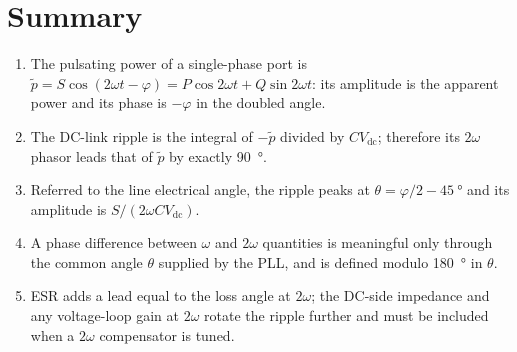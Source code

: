 \section{Summary}

\begin{enumerate}
  \item The pulsating power of a single-phase port is
        $\tilde p = S\cos(2\omega t - \varphi)
                  = P\cos 2\omega t + Q \sin 2\omega t$: its amplitude is the
        apparent power and its phase is $-\varphi$ in the doubled angle.
  \item The DC-link ripple is the integral of $-\tilde p$ divided by
        $C V_{\mathrm{dc}}$; therefore its $2\omega$ phasor leads that of
        $\tilde p$ by exactly \SI{90}{\degree}.
  \item Referred to the line electrical angle, the ripple peaks at
        $\theta = \varphi/2 - \SI{45}{\degree}$ and its amplitude is
        $S/(2\omega C V_{\mathrm{dc}})$.
  \item A phase difference between $\omega$ and $2\omega$ quantities is
        meaningful only through the common angle $\theta$ supplied by the PLL,
        and is defined modulo \SI{180}{\degree} in $\theta$.
  \item ESR adds a lead equal to the loss angle at $2\omega$; the DC-side
        impedance and any voltage-loop gain at $2\omega$ rotate the ripple
        further and must be included when a $2\omega$ compensator is tuned.
\end{enumerate}

